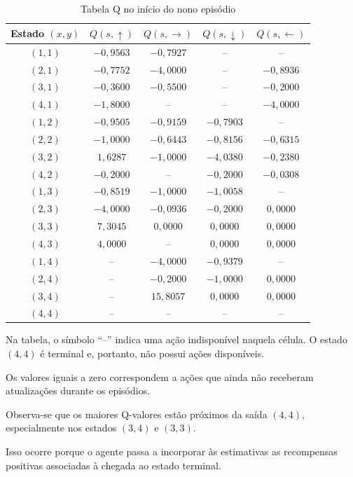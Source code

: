 \begin{table}[H]
\centering
\small
\caption{Tabela Q no início do nono episódio}
\label{tab:q_inicio_ep9}
\begin{tabular}{ccccc}
\toprule
Estado $(x,y)$ &
$Q(s,\uparrow)$ &
$Q(s,\rightarrow)$ &
$Q(s,\downarrow)$ &
$Q(s,\leftarrow)$\\
\midrule
$(1,1)$ & $-0{,}9563$ & $-0{,}7927$ & -- & --\\
$(2,1)$ & $-0{,}7752$ & $-4{,}0000$ & -- & $-0{,}8936$\\
$(3,1)$ & $-0{,}3600$ & $-0{,}5500$ & -- & $-0{,}2000$\\
$(4,1)$ & $-1{,}8000$ & -- & -- & $-4{,}0000$\\
\midrule
$(1,2)$ & $-0{,}9505$ & $-0{,}9159$ & $-0{,}7903$ & --\\
$(2,2)$ & $-1{,}0000$ & $-0{,}6443$ & $-0{,}8156$ & $-0{,}6315$\\
$(3,2)$ & $1{,}6287$ & $-1{,}0000$ & $-4{,}0380$ & $-0{,}2380$\\
$(4,2)$ & $-0{,}2000$ & -- & $-0{,}2000$ & $-0{,}0308$\\
\midrule
$(1,3)$ & $-0{,}8519$ & $-1{,}0000$ & $-1{,}0058$ & --\\
$(2,3)$ & $-4{,}0000$ & $-0{,}0936$ & $-0{,}2000$ & $0{,}0000$\\
$(3,3)$ & $7{,}3045$ & $0{,}0000$ & $0{,}0000$ & $0{,}0000$\\
$(4,3)$ & $4{,}0000$ & -- & $0{,}0000$ & $0{,}0000$\\
\midrule
$(1,4)$ & -- & $-4{,}0000$ & $-0{,}9379$ & --\\
$(2,4)$ & -- & $-0{,}2000$ & $-1{,}0000$ & $0{,}0000$\\
$(3,4)$ & -- & $15{,}8057$ & $0{,}0000$ & $0{,}0000$\\
$(4,4)$ & -- & -- & -- & --\\
\bottomrule
\end{tabular}
\end{table}

Na tabela, o símbolo ``--'' indica
uma ação indisponível naquela célula.
O estado $(4,4)$ é terminal e,
portanto, não possui ações disponíveis.

Os valores iguais a zero correspondem
a ações que ainda não receberam
atualizações durante os episódios.

Observa-se que os maiores Q-valores
estão próximos da saída $(4,4)$,
especialmente nos estados $(3,4)$
e $(3,3)$.

Isso ocorre porque o agente
passa a incorporar às estimativas
as recompensas positivas associadas
à chegada ao estado terminal.


